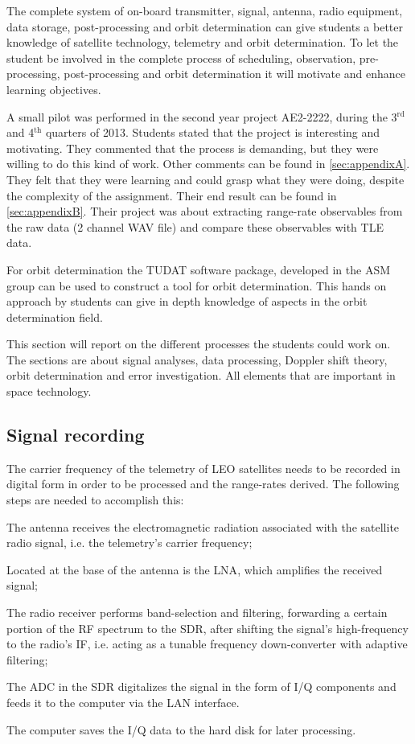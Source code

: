 \documentclass[11pt,a4paper,oneside]{article}
\newcommand{\listskip}{0pt}
\newenvironment{itemize*}
{\begin{itemize}
  \setlength{\itemsep}{\listskip}
  \setlength{\parskip}{\listskip}
  \setlength{\parsep}{\listskip}}
{\end{itemize}}
\newcommand{\superscript}[1]{\ensuremath{^{\textrm{#1}}}}
\begin{document}
The complete system of on-board transmitter, signal, antenna, radio equipment, data storage, post-processing and orbit determination can give students a better knowledge of satellite technology, telemetry and orbit determination. To let the student be involved in the complete process of scheduling, observation, pre-processing, post-processing and orbit determination it will motivate and enhance learning objectives.

A small pilot was performed in the second year project AE2-2222, during the 3\superscript{rd} and 4\superscript{th} quarters of 2013. Students stated that the project is interesting and motivating. They commented that the process is demanding, but they were willing to do this kind of work. Other comments can be found in \ref{sec:appendixA}. They felt that they were learning and could grasp what they were doing, despite the complexity of the assignment. Their end result can be found in \ref{sec:appendixB}. Their project was about extracting range-rate observables from the raw data (2 channel \ac{WAV} file) and compare these observables with \ac{TLE} data.

For orbit determination the \ac{TUDAT} software package, developed in the \ac{ASM} group can be used to construct a tool for orbit determination. This hands on approach by students can give in depth knowledge of aspects in the orbit determination field.

This section will report on the different processes the students could work on. The sections are about signal analyses, data processing, Doppler shift theory, orbit determination and error investigation. All elements that are important in space technology.



\subsection{Signal recording}

The carrier frequency of the telemetry of \ac{LEO} satellites needs to be recorded in digital form in order to be processed and the range-rates derived. The following steps are needed to accomplish this:

\begin{itemize*}
\item The antenna receives the electromagnetic radiation associated with the satellite radio signal, i.e. the telemetry's carrier frequency;
\item Located at the base of the antenna is the \ac{LNA}, which amplifies the received signal;
\item The radio receiver performs band-selection and filtering, forwarding a certain portion of the \ac{RF} spectrum to the \ac{SDR}, after shifting the signal's high-frequency to the radio's \ac{IF}, i.e. acting as a tunable frequency down-converter with adaptive filtering;
\item The \ac{ADC} in the \ac{SDR} digitalizes the signal in the form of \ac{I/Q} components and feeds it to the computer via the \ac{LAN} interface.
\item The computer saves the \ac{I/Q} data to the hard disk for later processing.
\end{itemize*}
\end{document}
